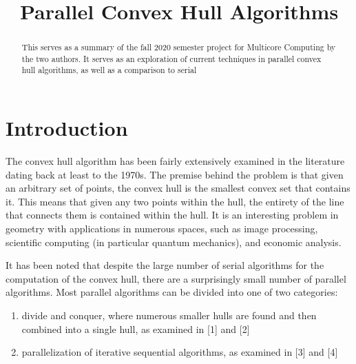 \documentclass[conference]{IEEEtran}
\begin{document}
\title{Parallel Convex Hull Algorithms\\}

\author{
\and
{}
}

\maketitle

\begin{abstract}
This serves as a summary of the fall 2020 semester project for Multicore Computing by the two authors. It serves as an exploration of current techniques in parallel convex hull algorithms, as well as a comparison to serial 
\end{abstract}

\section{Introduction}
The convex hull algorithm has been fairly extensively examined in the literature dating back at least to the 1970s. The premise behind the problem is that given an arbitrary set of points, the convex hull is the smallest convex set that contains it. This means that given any two points within the hull, the entirety of the line that connects them is contained within the hull. It is an interesting problem in geometry with applications in numerous spaces, such as image processing, scientific computing (in particular quantum mechanics), and economic analysis.

It has been noted that despite the large number of serial algorithms for the computation of the convex hull, there are a surprisingly small number of parallel algorithms. Most parallel algorithms can be divided into one of two categories: 
\begin{enumerate}
    \item divide and conquer, where numerous smaller hulls are found and then combined into a single hull, as examined in [1] and [2]
    \item parallelization of iterative sequential algorithms, as examined in [3] and [4]
\end{enumerate} 
\end{document}
